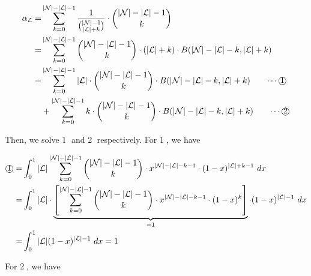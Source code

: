 \begin{small}
\begin{align*}
\alpha_\mathcal{L} =& \sum_{k=0}^{|\mathcal{N}|-|\mathcal{L}|-1}\frac{1}{\binom{|\mathcal{N}|-1}{|\mathcal{L}|+k}}\cdot\binom{|\mathcal{N}|-|\mathcal{L}|-1}{k} \\
=& \sum_{k=0}^{|\mathcal{N}|-|\mathcal{L}|-1}\binom{|\mathcal{N}|-|\mathcal{L}|-1}{k}\cdot (|\mathcal{L}|+k)\cdot B(|\mathcal{N}|-|\mathcal{L}|-k, |\mathcal{L}|+k)\\
=& \sum_{k=0}^{|\mathcal{N}|-|\mathcal{L}|-1} |\mathcal{L}|\cdot \binom{|\mathcal{N}|-|\mathcal{L}|-1}{k} \cdot B(|\mathcal{N}|-|\mathcal{L}|-k, |\mathcal{L}|+k)\qquad\text{$\cdots$\textcircled{1}}\\
&+ \sum_{k=0}^{|\mathcal{N}|-|\mathcal{L}|-1} k\cdot \binom{|\mathcal{N}|-|\mathcal{L}|-1}{k} \cdot B(|\mathcal{N}|-|\mathcal{L}|-k, |\mathcal{L}|+k)\qquad\text{$\cdots$\textcircled{2}}
\end{align*}
\end{small}

Then, we solve \textcircled{1} and \textcircled{2} respectively. For \textcircled{1}, we have


\begin{small}
\begin{align*}
\text{\textcircled{1}} =& \int_{0}^{1}|\mathcal{L}|\sum_{k=0}^{|\mathcal{N}|-|\mathcal{L}|-1}\binom{|\mathcal{N}|-|\mathcal{L}|-1}{k}\cdot x^{|\mathcal{N}|-|\mathcal{L}|-k-1}\cdot (1-x)^{|\mathcal{L}|+k-1}\ dx\\
=& \int_{0}^{1}|\mathcal{L}|\cdot\underbrace{\left[\sum_{k=0}^{|\mathcal{N}|-|\mathcal{L}|-1}\binom{|\mathcal{N}|-|\mathcal{L}|-1}{k}\cdot x^{|\mathcal{N}|-|\mathcal{L}|-k-1}\cdot (1-x)^{k}\right]}_{=1}\cdot (1-x)^{|\mathcal{L}|-1}\ dx\\
=& \int_{0}^{1}|\mathcal{L}|(1-x)^{|\mathcal{L}|-1}\ dx = 1
\end{align*}
\end{small}

For \textcircled{2}, we have


